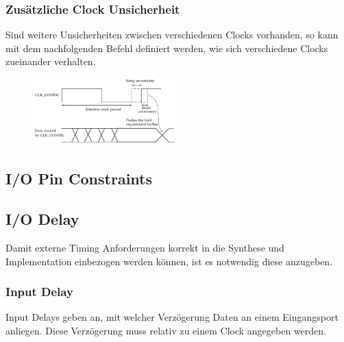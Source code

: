 \begin{multicols}{2}
    \subsubsection{Zusätzliche Clock Unsicherheit}
    Sind weitere Unsicherheiten zwischen verschiedenen Clocks vorhanden, so kann mit dem nachfolgenden Befehl definiert werden, wie sich verschiedene Clocks zueinander verhalten.
    
    \begin{figure}[H]
        \includegraphics[width=0.5\textwidth]{images/clock_uncertainty.png}
    \end{figure}
\end{multicols}

\subsection{I/O Pin Constraints}


\subsection{I/O Delay}
Damit externe Timing Anforderungen korrekt in die Synthese und Implementation einbezogen werden können, ist es notwendig diese anzugeben.

\subsubsection{Input Delay} \label{chapter:input_delay}
Input Delays geben an, mit welcher Verzögerung Daten an einem Eingangsport anliegen. Diese Verzögerung muss relativ zu einem Clock angegeben werden.

